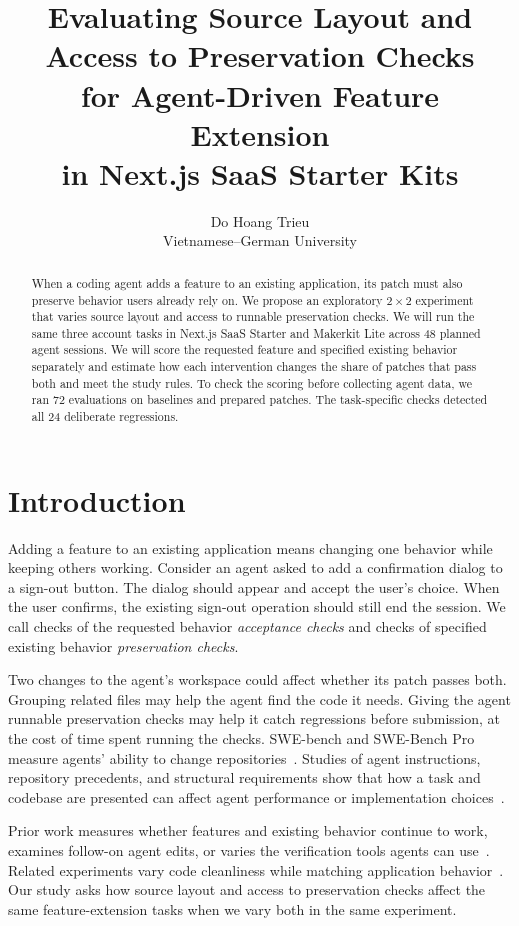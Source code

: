 \documentclass[11pt,a4paper]{article}
\title{Evaluating Source Layout and Access to Preservation Checks\\for Agent-Driven Feature Extension\\in Next.js SaaS Starter Kits}
\author{Do Hoang Trieu\\Vietnamese--German University}
\date{}
\begin{document}
\maketitle
\begin{abstract}
When a coding agent adds a feature to an existing application, its patch must also preserve behavior users already rely on. We propose an exploratory $2\times2$ experiment that varies source layout and access to runnable preservation checks. We will run the same three account tasks in Next.js SaaS Starter and Makerkit Lite across 48 planned agent sessions. We will score the requested feature and specified existing behavior separately and estimate how each intervention changes the share of patches that pass both and meet the study rules. To check the scoring before collecting agent data, we ran 72 evaluations on baselines and prepared patches. The task-specific checks detected all 24 deliberate regressions.
\end{abstract}

\section{Introduction}
Adding a feature to an existing application means changing one behavior while keeping others working. Consider an agent asked to add a confirmation dialog to a sign-out button. The dialog should appear and accept the user's choice. When the user confirms, the existing sign-out operation should still end the session. We call checks of the requested behavior \emph{acceptance checks} and checks of specified existing behavior \emph{preservation checks}.

Two changes to the agent's workspace could affect whether its patch passes both. Grouping related files may help the agent find the code it needs. Giving the agent runnable preservation checks may help it catch regressions before submission, at the cost of time spent running the checks. SWE-bench and SWE-Bench Pro measure agents' ability to change repositories~\cite{jimenez2024swebench,deng2025swepro}. Studies of agent instructions, repository precedents, and structural requirements show that how a task and codebase are presented can affect agent performance or implementation choices~\cite{gloaguen2026agents,zhu2026precedent,dente2026constraint}.

Prior work measures whether features and existing behavior continue to work, examines follow-on agent edits, or varies the verification tools agents can use~\cite{wang2026featurearc,feng2026featureloop,chen2026featbench,patel2026codethread,mehta2026verification}. Related experiments vary code cleanliness while matching application behavior~\cite{trivedi2026cleanliness}. Our study asks how source layout and access to preservation checks affect the same feature-extension tasks when we vary both in the same experiment.
\end{document}
